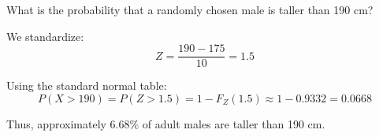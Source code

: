 \documentclass[twoside]{book}
\begin{document}
What is the probability that a randomly chosen male is taller than 190 cm?

We standardize:
\[
Z = \frac{190 - 175}{10} = 1.5
\]

Using the standard normal table:
\[
P(X > 190) = P(Z > 1.5) = 1 - F_Z(1.5) \approx 1 - 0.9332 = 0.0668
\]

Thus, approximately $6.68\%$ of adult males are taller than 190 cm.


\end{document}
